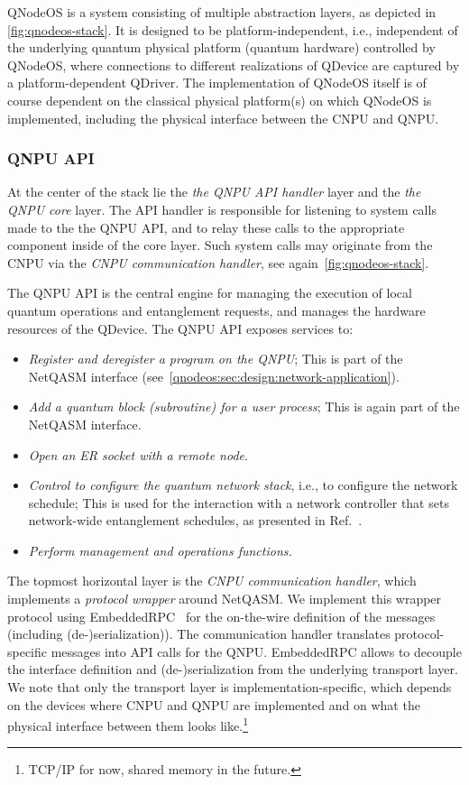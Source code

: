 \ac{QNodeOS} is a system consisting of multiple abstraction layers, as depicted in \cref{fig:qnodeos-stack}. It is designed to be platform-independent, i.e., independent of the underlying quantum physical platform (quantum hardware) controlled by \ac{QNodeOS}, where connections to different realizations of \ac{QDevice} are captured by a platform-dependent \ac{QDriver}. The implementation of \ac{QNodeOS} itself is of course dependent on the classical physical platform(s) on which \ac{QNodeOS} is implemented, including the physical interface between the \ac{CNPU} and \ac{QNPU}.

\subsubsection{QNPU API}
\label{qnodeos:sec:QNPU-api}

At the center of the stack lie the \emph{the \ac{QNPU} \ac{API} handler} layer and the \emph{the \ac{QNPU} core} layer. The \ac{API} handler is responsible for listening to system calls made to the the \ac{QNPU} \ac{API}, and to relay these calls to the appropriate component inside of the core layer. Such system calls may originate from the \ac{CNPU} via the \emph{CNPU communication handler}, see again~\cref{fig:qnodeos-stack}. 

The \ac{QNPU} \ac{API} is the central engine for managing the execution of local quantum operations and entanglement requests, and manages the hardware resources of the \ac{QDevice}. The \ac{QNPU} \ac{API} exposes services to:
%
\begin{itemize}
\item \emph{Register and deregister a program on the \ac{QNPU}}; This is part of the \ac{NetQASM} interface (see~\cref{qnodeos:sec:design:network-application}).
\item \emph{Add a quantum block (subroutine) for a user process}; This is again part of the \ac{NetQASM} interface.
\item \emph{Open an \ac{ER} socket with a remote node}.
\item \emph{Control to configure the quantum network stack}, i.e., to configure the network schedule; This is used for the interaction with a network controller that sets network-wide entanglement schedules, as presented in Ref.~\cite{skrzypczyk_2021_arch}.
\item \emph{Perform management and operations functions.}
\end{itemize}
%
The topmost horizontal layer is the \emph{\ac{CNPU} communication handler}, which implements a \emph{protocol wrapper} around \ac{NetQASM}.
We implement this wrapper protocol using EmbeddedRPC~\cite{erpc} for the on-the-wire definition of the messages (including (de-)serialization)). The communication handler translates protocol-specific messages into \ac{API} calls for the \ac{QNPU}. EmbeddedRPC allows to decouple the interface definition and (de-)serialization from the underlying transport layer. We note that only the transport layer is implementation-specific, which depends on the devices where \ac{CNPU} and \ac{QNPU} are implemented and on what the physical interface between them looks like.\footnote{TCP/IP for now, shared memory in the future.}

